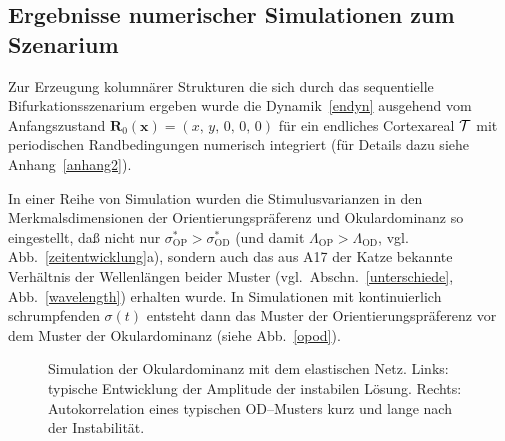\subsection{Ergebnisse numerischer Simulationen zum Szenarium}
\label{numerg}

Zur Erzeugung kolumnärer Strukturen die sich durch das sequentielle
Bifurkationsszenarium ergeben wurde die Dynamik~\eqref{endyn} ausgehend vom
Anfangszustand $\mathbf{R}_0(\mathbf{x}) = (x,\, y,\, 0,\, 0,\, 0) $ für
ein endliches Cortexareal $\cal T$ mit periodischen Randbedingungen
numerisch integriert (für Details dazu siehe Anhang~\ref{anhang2}).

In einer Reihe von  Simulation  wurden die Stimulusvarianzen in den
Merkmalsdimensionen der Orientierungspräferenz und Okulardominanz  so
eingestellt, daß nicht nur $\sigma^\ast_{\text{OP}}>\sigma^\ast_{\text{OD}}$
(und damit $\Lambda_{\text{OP}} > \Lambda_{\text{OD}}$,
vgl. Abb.~\ref{zeitentwicklung}a), sondern auch
das aus A17 der Katze bekannte Verhältnis der Wellenlängen beider
Muster (vgl.~Abschn.~\ref{unterschiede}, Abb.~\ref{wavelength})
erhalten wurde.  In Simulationen mit kontinuierlich schrumpfenden
$\sigma(t)$ entsteht dann das Muster der Orientierungspräferenz vor dem
Muster der Okulardominanz (siehe Abb.~\ref{opod}).

\begin{figure}[h!]
\begin{center}
\end{center}
\caption{Simulation der Okulardominanz mit dem elastischen Netz. Links:
typische Entwicklung der Amplitude der instabilen Lösung. Rechts:
Autokorrelation eines typischen OD--Musters kurz und lange nach der
Instabilität.}
\label{umordnung}
\end{figure}


